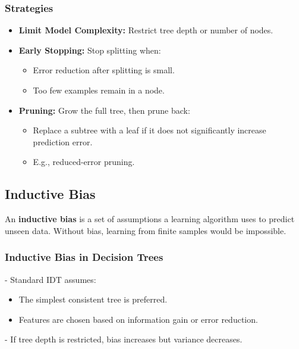 \subsubsection*{Strategies}
\begin{itemize}
    \item \textbf{Limit Model Complexity:}  
          Restrict tree depth or number of nodes.
    \item \textbf{Early Stopping:}  
          Stop splitting when:
          \begin{itemize}
              \item Error reduction after splitting is small.
              \item Too few examples remain in a node.
          \end{itemize}
    \item \textbf{Pruning:}  
          Grow the full tree, then prune back:
          \begin{itemize}
              \item Replace a subtree with a leaf if it does not significantly increase prediction error.
              \item E.g., reduced-error pruning.
          \end{itemize}
\end{itemize}

\subsection*{Inductive Bias}

\begin{definition}
An \textbf{inductive bias} is a set of assumptions a learning algorithm uses to predict unseen data.  
Without bias, learning from finite samples would be impossible.
\end{definition}

\subsubsection*{Inductive Bias in Decision Trees}
- Standard IDT assumes:
    \begin{itemize}
        \item The simplest consistent tree is preferred.
        \item Features are chosen based on information gain or error reduction.
    \end{itemize}
- If tree depth is restricted, bias increases but variance decreases.

